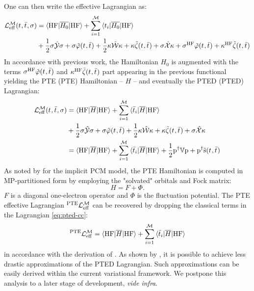 One can then write the effective Lagrangian as:
\begin{equation}
  \begin{aligned}
  \mathcal{L}^\mathcal{M}_\mathrm{eff}(t_{}, \bar{t}_{}, \sigma) &=
  \braket{\mathrm{HF} | \overline{H_0} | \mathrm{HF}}
  + \sum_{i=1}^{\mathcal{M}}\braket{t_{i} | \overline{H_0} | \mathrm{HF}} \\
  &+ \frac{1}{2}\sigma\hat{\mathcal{Y}}\sigma
  + \sigma\tilde{\varphi}(t_{}, \bar{t}_{})
  + \frac{1}{2}\kappa\hat{\mathcal{W}}\kappa
  + \kappa\tilde{\zeta}(t_{}, \bar{t}_{})
  + \sigma\hat{\mathcal{X}}\kappa
  + \sigma^\mathrm{HF}\tilde{\varphi}(t_{}, \bar{t}_{})
  + \kappa^\mathrm{HF}\tilde{\zeta}(t_{}, \bar{t}_{})
  \end{aligned}
\end{equation}
In accordance with previous work,\autocite{Cammi2009-gu, Caricato2011-tx} the
Hamiltonian $H_0$ is augmented with the terms
$\sigma^\mathrm{HF}\tilde{\varphi}(t_{}, \bar{t}_{})$ and
$\kappa^\mathrm{HF}\tilde{\zeta}(t_{}, \bar{t}_{})$
part appearing in the previous functional yielding the \acl{PTE} (\acs{PTE}) Hamiltonian --
$H$ -- and
eventually the \acl{PTED} (\acs{PTED}) Lagrangian:
\begin{equation}\label{eq:pted-cc}
  \begin{aligned}
  \mathcal{L}^\mathcal{M}_\mathrm{eff}(t_{}, \bar{t}_{}, \sigma) &=
  \braket{\mathrm{HF} | \overline{H} | \mathrm{HF}}
  + \sum_{i=1}^{\mathcal{M}}\braket{\bar{t}_{i} | \overline{H} | \mathrm{HF}} \\
  &+ \frac{1}{2}\sigma\hat{\mathcal{Y}}\sigma
  + \sigma\tilde{\varphi}(t_{}, \bar{t}_{})
  + \frac{1}{2}\kappa\hat{\mathcal{W}}\kappa
  + \kappa\tilde{\zeta}(t_{}, \bar{t}_{})
  + \sigma\hat{\mathcal{X}}\kappa \\
  &=
  \braket{\mathrm{HF} | \overline{H} | \mathrm{HF}}
  + \sum_{i=1}^{\mathcal{M}}\braket{\bar{t}_{i} | \overline{H} | \mathrm{HF}}
  + \frac{1}{2}\mathrm{p}^\dagger\mathbb{V}\mathrm{p} + \mathrm{p}^\dagger\tilde{\mathrm{s}}(t_{},\bar{t}_{})
  \end{aligned}
\end{equation}
As noted by \citeauthor{Cammi2009-gu} for the implicit \acs{PCM} model,
the \acs{PTE} Hamiltonian is computed in \acs{MP}-partitioned form by
employing the "solvated" orbitals and Fock matrix:
\begin{equation}
  H = F + \Phi.
\end{equation}
$F$ is a diagonal one-electron operator and $\Phi$ is the
fluctuation potential.
The \acs{PTE} effective Lagrangian ${}^\mathrm{PTE}\mathcal{L}^\mathcal{M}_\mathrm{eff}$ can be
recovered by dropping the classical terms in the Lagrangian
\eqref{eq:pted-cc}:
\begin{equation}
{}^\mathrm{PTE}\mathcal{L}^\mathcal{M}_\mathrm{eff}
  =
  \braket{\mathrm{HF} | \overline{H} | \mathrm{HF}}
  + \sum_{i=1}^{\mathcal{M}}\braket{\bar{t}_{i} | \overline{H} | \mathrm{HF}}
\end{equation}
in accordance with the derivation of \citeauthor{Cammi2009-gu}.
As shown by \citeauthor{Caricato2011-tx}, it is possible to achieve less
drastic approximations of the \acs{PTED} Lagrangian. Such approximations
can be easily derived within the current variational framework. We
postpone this analysis to a later stage of development, \emph{vide
infra}.

